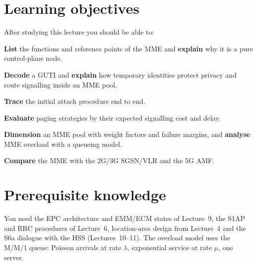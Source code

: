 \documentclass[11pt,a4paper]{article}
\begin{document}
\ACNcover

\section{Learning objectives}
After studying this lecture you should be able to:
\begin{objectives}
  \item \textbf{List} the functions and reference points of the MME and \textbf{explain} why it is a pure
        control-plane node.
  \item \textbf{Decode} a GUTI and \textbf{explain} how temporary identities protect privacy and route
        signalling inside an MME pool.
  \item \textbf{Trace} the initial attach procedure end to end.
  \item \textbf{Evaluate} paging strategies by their expected signalling cost and delay.
  \item \textbf{Dimension} an MME pool with weight factors and failure margins, and \textbf{analyse} MME
        overload with a queueing model.
  \item \textbf{Compare} the MME with the 2G/3G SGSN/VLR and the 5G AMF.
\end{objectives}

\section{Prerequisite knowledge}
You need the EPC architecture and EMM/ECM states of Lecture~9, the S1AP and RRC procedures of
Lecture~6, location-area design from Lecture~4 and the S6a dialogue with the HSS (Lectures~10--11).
The overload model uses the M/M/1 queue: Poisson arrivals at rate $\lambda$, exponential service at
rate $\mu$, one server.
\end{document}
